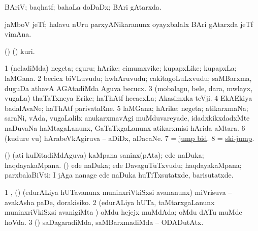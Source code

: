 \bentry
{}
\gl{\gu}
\bmng
BAriV; baqhatf; bahaLa doDaDx; BAri gAtarxda. 
\emng
\eentry

\bentry
{}
\gl{\nA}
\bmng
jaMboV jeTf; halavu nUru parxyANikaranunx oyayxbalalx BAri gAtarxda jeTf vimAna. 
\emng
\eentry

\bentry
{}
\gl{\nA}
\bmng
(\AseTxrXV) (\AmA) kuri. 
\emng
\eentry

\bentry
{}
\gl{\nA}
\bmng
\bnum
\num{1} (neladiMda) negeta; eguru; hArike; cimumxvike; kupapxLike; kupapxLa; laMGana. 
\num{2} becicx biVLuvudu; hwhAruvudu; cakitagoLuLxvudu; saMBarxma, duguDa athavA AGAtadiMda Aguva becucx. 
\num{3} (mobalagu, bele, dara, mwlayx, \mo vugaLa) thaTaTxneya Erike; haThAtf hecacxLa; Akasimxka teVji. 
\num{4} EkAEkiya badalAvaNe; haThAtf parivataRne. 
\num{5} laMGana; hArike; negeta; atikarxmaNa; saraNi, vAda, \mo vugaLalilx anukarxmavAgi muMduvareyade, idadxkikxdadxMte naDuvaNa haMtagaLanunx, GaTaTxgaLanunx atikarxmisi hArida aMtara. 
\num{6} (kudure \mo vu) hArabeVkAgiruva -- aDiDx, aDacaNe. 
\num{7}  = \hyperlink{jump bid}{jump bid}. 
\num{8} = \hyperref{kandict_s.pdf}{S}{ski-jump}{ski-jump}. 
\enum
\emng

\noindent
\gl{\pagu}
\bmng
{} (\ashi) 
\banum
{} (ati kuDitadiMdAguva) kaMpana saninx(pAta); ede naDuka; haqdayakaMpana. 
 (\rUpa) ede naDuka; ede DavaguTuTxvudu; haqdayakaMpana; parxbalaBiVti:  I jAga nanage ede naDuka huTiTxsutatxde, barisutatxde. 
\eanum
\emng

\noindent
\gl{\nuga}
\bmng
\bnum
\num{1} ,  (\ashi) (edurALiya hUTavanunx muninxriVkiSxsi avananunx) miVrisuva -- avakAsha paDe, dorakisiko. 
\num{2}  (edurALiya hUTa, taMtarxgaLanunx muninxriVkiSxsi avanigiMta ) oMdu hejejx muMdAda; oMdu dATu muMde hoVda. 
\num{3}  (\AmA) saDagaradiMda, saMBarxmadiMda -- ODADutAtx. 
\enum
\emng
\eentry


